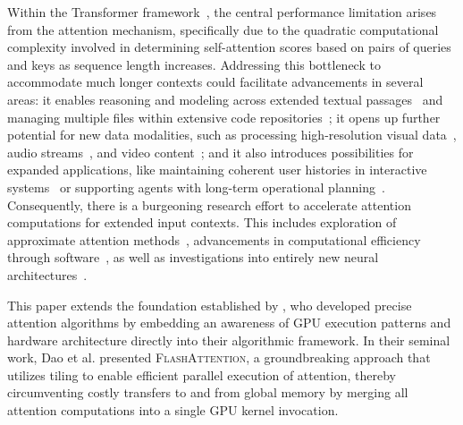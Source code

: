 Within the Transformer framework~\citep{vaswani2017attention}, the central performance limitation arises from the attention mechanism, specifically due to the quadratic computational complexity involved in determining self-attention scores based on pairs of queries and keys as sequence length increases. Addressing this bottleneck to accommodate much longer contexts could facilitate advancements in several areas: it enables reasoning and modeling across extended textual passages~\citep{guo2021longt5,shaham2022scrolls,peng2023yarn} and managing multiple files within extensive code repositories~\citep{roziere2023code, li2023starcoder}; it opens up further potential for new data modalities, such as processing high-resolution visual data~\citep{chen2022scaling}, audio streams~\citep{gulati2020conformer}, and video content~\citep{ho2022video}; and it also introduces possibilities for expanded applications, like maintaining coherent user histories in interactive systems~\citep{sun2019bert4rec} or supporting agents with long-term operational planning~\citep{yao2022react}. Consequently, there is a burgeoning research effort to accelerate attention computations for extended input contexts. This includes exploration of approximate attention methods~\citep{katharopoulos2020transformers,choromanski2020rethinking, tay2020efficient}, advancements in computational efficiency through software~\citep{rabe2021self,dao2022flashattention,kwon2023efficient}, as well as investigations into entirely new neural architectures~\citep{peng2023rwkv,sun2023retentive,gu2023mamba}.

This paper extends the foundation established by \citet{dao2022flashattention}, who developed precise attention algorithms by embedding an awareness of GPU execution patterns and hardware architecture directly into their algorithmic framework. In their seminal work, Dao et al. presented \textsc{FlashAttention}, a groundbreaking approach that utilizes tiling to enable efficient parallel execution of attention, thereby circumventing costly transfers to and from global memory by merging all attention computations into a single GPU kernel invocation.

